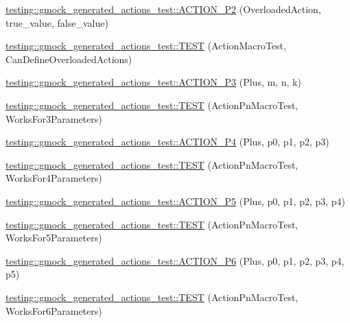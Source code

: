\begin{DoxyCompactItemize}
\item 
\mbox{\hyperlink{namespacetesting_1_1gmock__generated__actions__test_a233ee874462c7956e154945975da1127}{testing\+::gmock\+\_\+generated\+\_\+actions\+\_\+test\+::\+A\+C\+T\+I\+O\+N\+\_\+\+P2}} (Overloaded\+Action, true\+\_\+value, false\+\_\+value)
\item 
\mbox{\hyperlink{namespacetesting_1_1gmock__generated__actions__test_a8a3d26365bdae172067fe3a63bd88e85}{testing\+::gmock\+\_\+generated\+\_\+actions\+\_\+test\+::\+T\+E\+ST}} (Action\+Macro\+Test, Can\+Define\+Overloaded\+Actions)
\item 
\mbox{\hyperlink{namespacetesting_1_1gmock__generated__actions__test_a35c62beac532eaff7e54b8ad4a7fe1cf}{testing\+::gmock\+\_\+generated\+\_\+actions\+\_\+test\+::\+A\+C\+T\+I\+O\+N\+\_\+\+P3}} (Plus, m, n, k)
\item 
\mbox{\hyperlink{namespacetesting_1_1gmock__generated__actions__test_a3579cf2428f584d2a837c2c219ec1d5a}{testing\+::gmock\+\_\+generated\+\_\+actions\+\_\+test\+::\+T\+E\+ST}} (Action\+Pn\+Macro\+Test, Works\+For3\+Parameters)
\item 
\mbox{\hyperlink{namespacetesting_1_1gmock__generated__actions__test_ac86e9e1fa5be82823e80247ba093301c}{testing\+::gmock\+\_\+generated\+\_\+actions\+\_\+test\+::\+A\+C\+T\+I\+O\+N\+\_\+\+P4}} (Plus, p0, p1, p2, p3)
\item 
\mbox{\hyperlink{namespacetesting_1_1gmock__generated__actions__test_a6c13e382007960236763d638542bc5fe}{testing\+::gmock\+\_\+generated\+\_\+actions\+\_\+test\+::\+T\+E\+ST}} (Action\+Pn\+Macro\+Test, Works\+For4\+Parameters)
\item 
\mbox{\hyperlink{namespacetesting_1_1gmock__generated__actions__test_a948863fb38d913f02a0c5bde6be0b0a0}{testing\+::gmock\+\_\+generated\+\_\+actions\+\_\+test\+::\+A\+C\+T\+I\+O\+N\+\_\+\+P5}} (Plus, p0, p1, p2, p3, p4)
\item 
\mbox{\hyperlink{namespacetesting_1_1gmock__generated__actions__test_a132cab07373e037a06807a5948b1410b}{testing\+::gmock\+\_\+generated\+\_\+actions\+\_\+test\+::\+T\+E\+ST}} (Action\+Pn\+Macro\+Test, Works\+For5\+Parameters)
\item 
\mbox{\hyperlink{namespacetesting_1_1gmock__generated__actions__test_a97cbcc90a3063a1882886ded61fc8979}{testing\+::gmock\+\_\+generated\+\_\+actions\+\_\+test\+::\+A\+C\+T\+I\+O\+N\+\_\+\+P6}} (Plus, p0, p1, p2, p3, p4, p5)
\item 
\mbox{\hyperlink{namespacetesting_1_1gmock__generated__actions__test_a9031cb5f0e3d9de21ed3ff0a98a311d4}{testing\+::gmock\+\_\+generated\+\_\+actions\+\_\+test\+::\+T\+E\+ST}} (Action\+Pn\+Macro\+Test, Works\+For6\+Parameters)

\end{DoxyCompactItemize}
